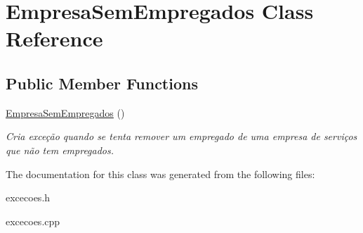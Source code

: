 \hypertarget{class_empresa_sem_empregados}{}\section{Empresa\+Sem\+Empregados Class Reference}
\label{class_empresa_sem_empregados}
\subsection*{Public Member Functions}
\begin{DoxyCompactItemize}
\item 
\hyperlink{class_empresa_sem_empregados_a674a4331127b86b3d27a430b13f062f9}{Empresa\+Sem\+Empregados} ()\hypertarget{class_empresa_sem_empregados_a674a4331127b86b3d27a430b13f062f9}{}\label{class_empresa_sem_empregados_a674a4331127b86b3d27a430b13f062f9}

\begin{DoxyCompactList}\small\item\em Cria exceção quando se tenta remover um empregado de uma empresa de serviços que não tem empregados. \end{DoxyCompactList}\end{DoxyCompactItemize}


The documentation for this class was generated from the following files\+:\begin{DoxyCompactItemize}
\item 
excecoes.\+h\item 
excecoes.\+cpp\end{DoxyCompactItemize}
